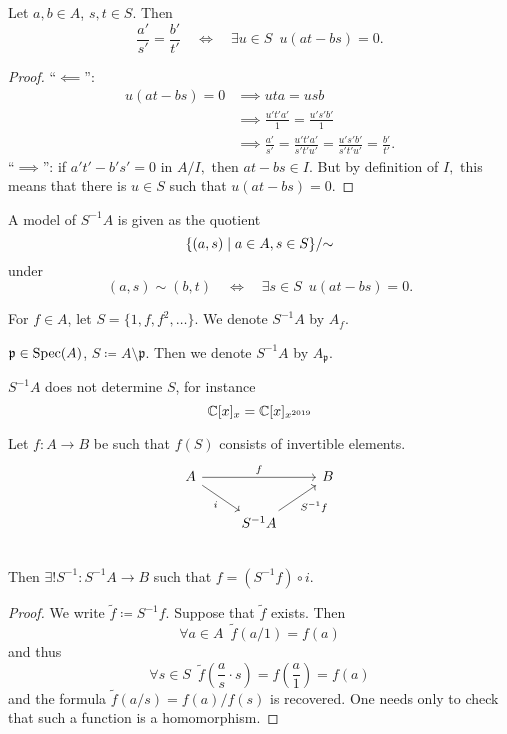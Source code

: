 \begin{lemma}
  Let $a, b \in A$, $s, t \in S$. Then
  \[ \frac{a'}{s'} = \frac{b'}{t'} \quad \iff \quad \exists u \in S \enspace u(at-bs)=0.\]
\end{lemma}
\begin{proof}
  ``$\impliedby$'':
  \begin{align*}
    u(at - bs) = 0 & \implies uta = usb \\
                   & \implies \frac{u't'a'}{1} = \frac{u's'b'}{1} \\
                   & \implies  \frac{a'}{s'} = \frac{u't'a'}{s't'u'} = \frac{u's'b'}{s't'u'} = \frac{b'}{t'}.
  \end{align*}
  ``$\implies$'': if \(a't' - b's' = 0\) in \(A/{I},\) then \(at - bs \in I.\) But by definition of \(I,\) this means that there is \(u \in S\) such that \(u(at - bs) = 0.\)
\end{proof}

\begin{corollary}
  A model of $S^{-1}A$ is given as the quotient
  \[ \{ (a, s) \mathrel{|} a \in A, s \in S \} /{\sim}\]
  under
  \[ (a, s) \sim (b, t) \quad \iff \quad \exists s \in S \enspace u(at - bs) = 0.\]
\end{corollary}

\begin{example}
  For $f \in A$, let $S = \{ 1, f, f^2, \ldots \}$. We denote $S^{-1}A$ by $A_f$.
\end{example}

\begin{example}
  $\mathfrak p \in \text{Spec}(A)$,
  $S \coloneqq A \setminus \mathfrak p$.
  Then we denote $S^{-1}A$ by $A_{\mathfrak p}$.
\end{example}

\begin{note}
  $S^{-1}A$ does not determine $S$, for instance
  \[ \mathbb C [x]_x = \mathbb C [x]_{x^{2019}} \]
\end{note}

\begin{prop}
  \label{loc-univ}
  Let $f: A \to B$ be such that $f(S)$ consists of invertible elements.
\begin{equation*}
  \begin{tikzcd}
    A \arrow{rr}{f} \arrow[swap]{dr}{i}
    & & B \\
    & S^{-1}A \arrow{ru}[swap]{S^{-1}f}
    & \\
  \end{tikzcd}
  \end{equation*}
  Then $\exists ! S^{-1} \colon S^{-1}A \to B$
  such that
  $f = (S^{-1}f) \circ i$.
\end{prop}
\begin{proof}
  We write $\tilde f \coloneqq S^{-1}f$. Suppose that $\tilde f$ exists. Then
  \[ \forall a \in A \enspace \tilde f (a / 1) = f(a) \]
  and thus
  \[ \forall s \in S \enspace \tilde f(\frac{a}{s} \cdot s) = f(\frac{a}{1}) = f(a) \]
  and the formula
  $\tilde{f}(a / s) = f(a) / f(s)$
  is recovered.
  One needs only to check that such a function is a homomorphism.
\end{proof}

